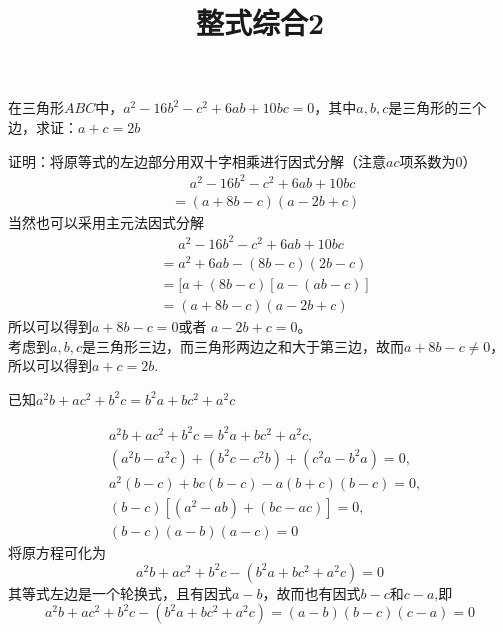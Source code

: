\documentclass[windows,csize4,answers]{BHCexam}
\title{整式综合2}
\begin{document}
\maketitle

\begin{groups}

    \begin{questions}[]

        \question[5]  在三角形$ABC$中，$a^2-16b^2-c^2+6ab+10bc=0$，其中$a,b,c$是三角形的三个边，求证：$a+c=2b$
        \begin{solution}{0.5cm}
            \methodonly 证明：将原等式的左边部分用双十字相乘进行因式分解（注意$ac$项系数为$0$） \\
            \[
                \begin{aligned}
                     & \phantom{=} a^2-16b^2-c^2+6ab+10bc \\
                     & = (a+8b-c)(a-2b+c)
                \end{aligned}
            \]
            当然也可以采用主元法因式分解
            \[
                \begin{aligned}
                     & \phantom{=} a^2-16b^2-c^2+6ab+10bc \\
                     & = a^2+6ab-(8b-c)(2b-c)             \\
                     & =[a+(8b-c)[a-(ab-c)]               \\
                     & = (a+8b-c)(a-2b+c)
                \end{aligned}
            \]
            所以可以得到$a+8b-c=0$或者 $a-2b+c=0$。\\
            考虑到$a,b,c$是三角形三边，而三角形两边之和大于第三边，故而$a+8b-c\neq 0$，所以可以得到$a+c=2b$.
        \end{solution}
        \vspace{3.5cm}

        \question[5]  已知$a^2b+ac^2+b^2c=b^2a+bc^2+a^2c$
        \begin{solution}{0.5cm}
            \method
            \[
                \begin{aligned}
                     & a^2b+ac^2+b^2c=b^2a+bc^2+a^2c,         \\
                     & (a^2b-a^2c)+(b^2c-c^2b)+(c^2a-b^2a)=0, \\
                     & a^2(b-c)+bc(b-c)-a(b+c)(b-c)=0,        \\
                     & (b-c)[(a^2-ab)+(bc-ac)]=0,             \\
                     & (b-c)(a-b)(a-c) =0
                \end{aligned}
            \]
            \method 将原方程可化为
            \[
                a^2b+ac^2+b^2c-(b^2a+bc^2+a^2c)=0
            \]
            其等式左边是一个轮换式，且有因式$a-b$，故而也有因式$b-c$和$c-a$,即
            \[
                a^2b+ac^2+b^2c-(b^2a+bc^2+a^2c)=(a-b)(b-c)(c-a)=0
            \]
        \end{solution}
        \vspace{3.5cm}



\end{questions}
\end{groups}
\end{document}
